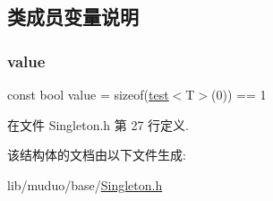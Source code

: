 \subsection{类成员变量说明}
\mbox{\label{structmuduo_1_1detail_1_1has__no__destroy_a11ddd051208250c32dc4985abcafa86d}} 
\subsubsection{\texorpdfstring{value}{value}}
{\footnotesize\ttfamily const bool value = sizeof(\hyperlink{structmuduo_1_1detail_1_1has__no__destroy_a94256a2ddc14889abdb41149c9b31137}{test}$<$T$>$(0)) == 1\hspace{0.3cm}{\ttfamily [static]}}



在文件 Singleton.\+h 第 27 行定义.



该结构体的文档由以下文件生成\+:\begin{DoxyCompactItemize}
\item 
lib/muduo/base/\hyperlink{Singleton_8h}{Singleton.\+h}\end{DoxyCompactItemize}
